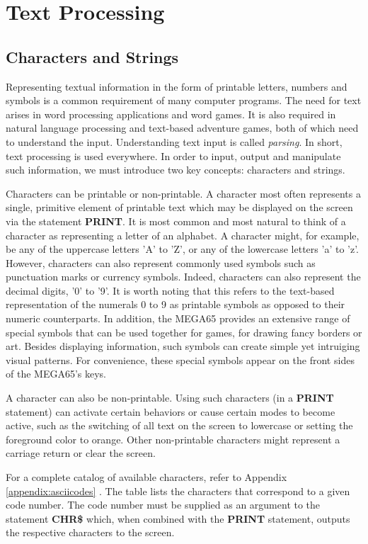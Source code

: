 \chapter{Text Processing}

\section{Characters and Strings}
Representing textual information in the form of printable letters, numbers and symbols is a common requirement of many computer programs. The need for text arises in word processing applications and word games. It is also required in natural language processing and text-based adventure games, both of which need to understand the input. Understanding text input is called {\it parsing}. In short, text processing is used everywhere. In order to input, output and manipulate such information, we must introduce two key concepts: characters and strings.

Characters can be printable or non-printable. A character most often represents a single, primitive element of printable text which may be displayed on the screen via the statement {\bf PRINT}. It is most common and most natural to think of a character as representing a letter of an alphabet. A character might, for example, be any of the uppercase letters 'A' to 'Z', or any of the lowercase letters 'a' to 'z'. However, characters can also represent commonly used symbols such as punctuation marks or currency symbols. Indeed, characters can also represent the decimal digits, '0' to '9'. It is worth noting that this refers to the text-based representation of the numerals 0 to 9 as printable symbols as opposed to their numeric counterparts. In addition, the MEGA65 provides an extensive range of special symbols that can be used together for games, for drawing fancy borders or art. Besides displaying information, such symbols can create simple yet intruiging visual patterns. For convenience, these special symbols appear on the front sides of the MEGA65's keys.

A character can also be non-printable. Using such characters (in a {\bf PRINT} statement) can activate certain behaviors or cause certain modes to become active, such as the switching of all text on the screen to lowercase or setting the foreground color to orange. Other non-printable characters might represent a carriage return or clear the screen.

For a complete catalog of available characters, refer to Appendix \ref{appendix:asciicodes} . The table lists the characters that correspond to a given code number. The code number must be supplied as an argument to the statement {\bf CHR\$} which, when combined with the {\bf PRINT} statement, outputs the respective characters to the screen.

